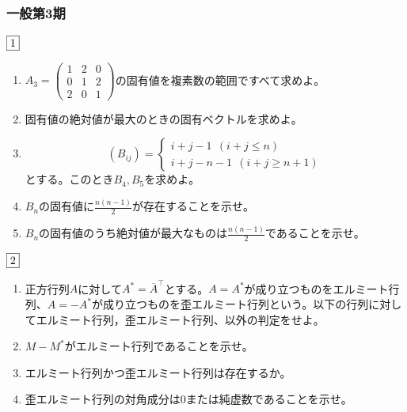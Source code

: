 \documentclass[dvipdfmx]{jsreport}
\newcommand{\tr}[1]{{#1}^\intercal}
\renewcommand{\bar}[1]{\overline{#1}} %
\newcounter{num}[section]
\begin{document}
\subsubsection{一般第3期}
\begin{tcolorbox} %
	$\fbox{1}$
\begin{enumerate}
	\item $A_3= \begin{pmatrix}1& 2& 0\\ 0& 1& 2\\ 2& 0& 1\end{pmatrix}$の固有値を複素数の範囲ですべて求めよ。
	\item 固有値の絶対値が最大のときの固有ベクトルを求めよ。
	\item 
\begin{equation*}
	(B_{ij})= 
\begin{cases}
	i+ j- 1\ \ (i+ j\le n)\\
	i+ j- n- 1\ \ (i+ j\ge n+ 1) 
\end{cases}
\end{equation*}
	とする。このとき$B_4, B_5$を求めよ。
	\item $B_n$の固有値に$\frac{n(n- 1)}{2}$が存在することを示せ。
	\item 	$B_n$の固有値のうち絶対値が最大なものは$\frac{n(n- 1)}{2}$であることを示せ。
\end{enumerate}
\end{tcolorbox}

\begin{tcolorbox} %
	$\fbox{2}$
\begin{enumerate}
	\item 正方行列$A$に対して$A^*= \tr{\bar{A}}$とする。$A= A^*$が成り立つものをエルミート行列、$A= -A^*$が成り立つものを歪エルミート行列という。以下の行列に対してエルミート行列，歪エルミート行列、以外の判定をせよ。
	\item $M- M^*$がエルミート行列であることを示せ。
	\item エルミート行列かつ歪エルミート行列は存在するか。
	\item 歪エルミート行列の対角成分は0または純虚数であることを示せ。
\end{enumerate}
\end{tcolorbox}
\end{document}
